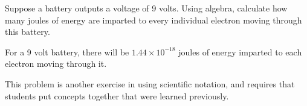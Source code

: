 

Suppose a battery outputs a voltage of 9 volts.  Using algebra, calculate how many joules of energy are imparted to every individual electron moving through this battery.







For a 9 volt battery, there will be $1.44 \times 10^{-18}$ joules of energy imparted to each electron moving through it.







This problem is another exercise in using scientific notation, and requires that students put concepts together that were learned previously.




